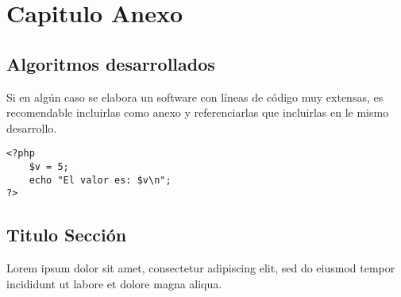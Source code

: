 \chapter{Capitulo Anexo}
\section{Algoritmos desarrollados}\label{A:01}
Si en algún caso se elabora un software con líneas de código muy extensas, es recomendable incluirlas como anexo y referenciarlas que incluirlas en le mismo desarrollo.

\lstset{language=PHP}
\begin{lstlisting}[caption= C\'odigo PHP de impresi\'on de una variable, label = codPH]
<?php
    $v = 5;
    echo "El valor es: $v\n";
?>
\end{lstlisting}

\section{Titulo Sección}
Lorem ipsum dolor sit amet, consectetur adipiscing elit, sed do eiusmod tempor incididunt ut labore et dolore magna aliqua.